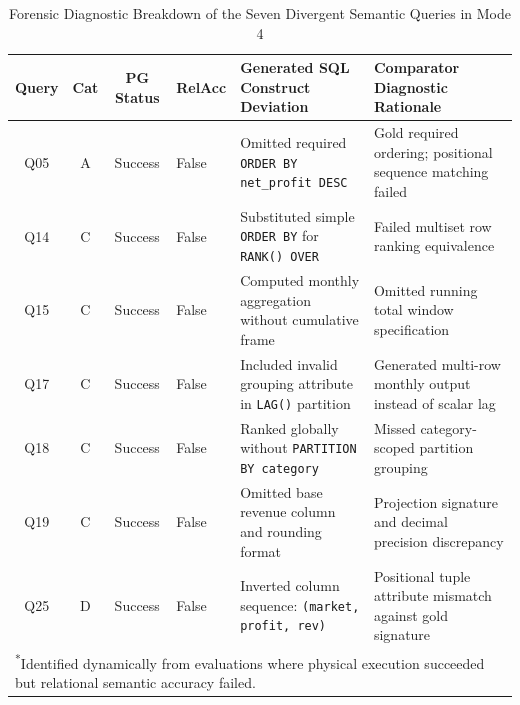 \begin{table}[t]
\centering
\caption{Forensic Diagnostic Breakdown of the Seven Divergent Semantic Queries in Mode 4}
\label{tab:divergent_queries}
\begin{tabular}{ccclp{4.8cm}p{4.2cm}}
\hline
\textbf{Query} & \textbf{Cat} & \textbf{PG Status} & \textbf{RelAcc} & \textbf{Generated SQL Construct Deviation} & \textbf{Comparator Diagnostic Rationale} \\
\hline
Q05 & A & Success & False & Omitted required \texttt{ORDER BY net\_profit DESC} & Gold required ordering; positional sequence matching failed \\
Q14 & C & Success & False & Substituted simple \texttt{ORDER BY} for \texttt{RANK() OVER} & Failed multiset row ranking equivalence \\
Q15 & C & Success & False & Computed monthly aggregation without cumulative frame & Omitted running total window specification \\
Q17 & C & Success & False & Included invalid grouping attribute in \texttt{LAG()} partition & Generated multi-row monthly output instead of scalar lag \\
Q18 & C & Success & False & Ranked globally without \texttt{PARTITION BY category} & Missed category-scoped partition grouping \\
Q19 & C & Success & False & Omitted base revenue column and rounding format & Projection signature and decimal precision discrepancy \\
Q25 & D & Success & False & Inverted column sequence: \texttt{(market, profit, rev)} & Positional tuple attribute mismatch against gold signature \\
\hline
\multicolumn{6}{l}{\footnotesize \textsuperscript{*}Identified dynamically from evaluations where physical execution succeeded but relational semantic accuracy failed.} \\
\end{tabular}
\end{table}
